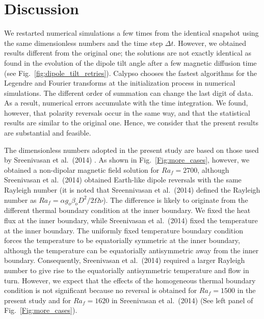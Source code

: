 \section{Discussion}
\label{section:discussion}

We restarted numerical simulations a few times from the identical snapshot using the same dimensionless numbers and the time step $\Delta t$.
However, we obtained results different from the original one; the solutions are not exactly identical
as found in the evolution of the dipole tilt angle after a few magnetic diffusion time (see Fig.~\ref{fig:dipole_tilt_retries}). 
Calypso chooses the fastest algorithms for the Legendre and Fourier transforms at the initialization process in numerical simulations. 
The different order of summation can change the last digit of data. 
As a result, numerical errors accumulate with the time integration. 
{\color{red}
We found, however, that polarity reversals occur in the same way, and that the statistical results are similar to the original one.
Hence, we consider that the present results are substantial and feasible.
}

The dimensionless numbers adopted in the present study are based on those used by Sreenivasan et al.\ (2014) \cite{Sreenivasan:2014}. 
As shown in Fig.~\ref{Fig:more_cases}, however, we obtained a non-dipolar magnetic field solution for $Ra_f = 2700$, although Sreenivasan et al.\ (2014) \cite{Sreenivasan:2014} obtained Earth-like dipole reversals with the same Rayleigh number (it is noted that Sreennivasan et al.\ (2014) defined the Rayleigh number as $Ra_f = \alpha g_o \beta_o D^2 / 2\Omega \nu$).
The difference is likely to originate from the different thermal boundary condition at the inner boundary. 
We fixed the heat flux at the inner boundary, while Sreenivasan et al.\ (2014) fixed the temperature at the inner boundary. 
{\color{red}
The uniformly fixed temperature boundary condition forces the temperature to be equatorially symmetric at the inner boundary, although the temperature can be equatorially antisymmetric away from the inner boundary.
}
Consequently, Sreenivasan et al.\ (2014) \cite{Sreenivasan:2014} required a larger Rayleigh number to give rise to the equatorially antisymmetric temperature and flow in turn. 
{\color{green}
However, we expect that the effects of the homogeneous thermal boundary condition is not significant because no reversal is obtained for $Ra_f = 1500$ in the present study and for $Ra_f = 1620$ in Sreenivasan et al.\ (2014) (See left panel of Fig.~\ref{Fig:more_cases}).
}

